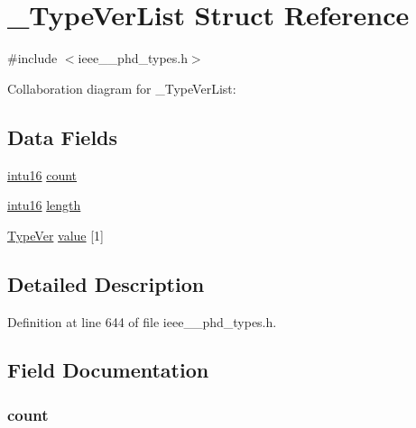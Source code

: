 \hypertarget{struct___type_ver_list}{}\section{\+\_\+\+Type\+Ver\+List Struct Reference}
\label{struct___type_ver_list}


{\ttfamily \#include $<$ieee\+\_\+\_\+phd\+\_\+types.\+h$>$}



Collaboration diagram for \+\_\+\+Type\+Ver\+List\+:
\subsection*{Data Fields}
\begin{DoxyCompactItemize}
\item 
\hyperlink{ieee__11073__phd__types_8h_a3561595d2aa7416532e1c9910abd076d}{intu16} \hyperlink{struct___type_ver_list_abf6db060ae8e224764b0f867fb135ecd}{count}
\item 
\hyperlink{ieee__11073__phd__types_8h_a3561595d2aa7416532e1c9910abd076d}{intu16} \hyperlink{struct___type_ver_list_a3743679e4ff85e3e1b3fc2e59973fbb3}{length}
\item 
\hyperlink{ieee__11073__phd__types_8h_a5ca812424b0ce52175e0396cdbdf7594}{Type\+Ver} \hyperlink{struct___type_ver_list_af11bd03543be13f22962ee28dd33ea95}{value} \mbox{[}1\mbox{]}
\end{DoxyCompactItemize}


\subsection{Detailed Description}


Definition at line 644 of file ieee\+\_\+\_\+phd\+\_\+types.\+h.



\subsection{Field Documentation}
\hypertarget{struct___type_ver_list_abf6db060ae8e224764b0f867fb135ecd}{}
\subsubsection[{count}]{ count}\label{struct___type_ver_list_abf6db060ae8e224764b0f867fb135ecd}


